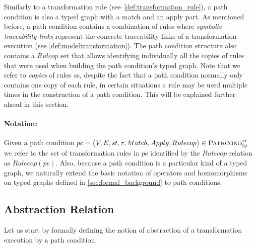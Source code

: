 Similarly to a transformation rule (see~\cref{def:transformation_rule}), a path condition is also a typed graph with a match and an apply part. As mentioned before, a path condition contains a combination of rules where \emph{symbolic traceability links} represent the concrete traceability links of a transformation execution (see \cref{def:modeltransformation}). The path condition structure also contains a $Rulcop$ set that allows identifying individually all the copies of rules that were used when building the path condition's typed graph. Note that we refer to \emph{copies} of rules as, despite the fact that a path condition normally only contains one copy of each rule, in certain situations a rule may be used multiple times in the construction of a path condition. This will be explained further ahead in this section.
 

\paragraph{\textbf{Notation:}}
Given a path condition $pc = \big\langle V,E,st,\tau,\\Match,Apply,Rulecop\big\rangle\in \textsc{Pathcond}^{sr}_{tg}$ we refer to the set of transformation rules in $pc$ identified by the $Rulecop$ relation as $Rulecop(pc)$. Also, because a path condition is a particular kind of a typed graph, we naturally extend the basic notation of operators and homomorphisms on typed graphs defined in \cref{sec:formal_background} to path conditions.

\subsection{Abstraction Relation}
\label{subsec:abstraction_relation}

Let us start by formally defining the notion of abstraction of a transformation
execution by a path condition.

\setcounter{equation}{0} 

